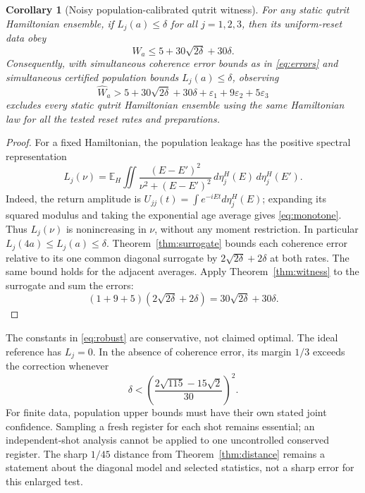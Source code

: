\documentclass[11pt,a4paper]{article}
\newtheorem{corollary}[theorem]{Corollary}
\newcommand{\E}{\mathbb E}
\begin{document}
\begin{corollary}[Noisy population-calibrated qutrit witness]\label{cor:robust}
For any static qutrit Hamiltonian ensemble, if
$L_j(a)\leq\delta$ for all $j=1,2,3$, then its uniform-reset data obey
\begin{equation}\label{eq:robust}
 W_a\leq5+30\sqrt{2\delta}+30\delta.
\end{equation}
Consequently, with simultaneous coherence error bounds as in
\eqref{eq:errors} and simultaneous certified population bounds
$L_j(a)\leq\delta$, observing
\[
 \widehat W_a>5+30\sqrt{2\delta}+30\delta
              +\varepsilon_1+9\varepsilon_2+5\varepsilon_3
\]
excludes every static qutrit Hamiltonian ensemble using the same
Hamiltonian law for all the tested reset rates and preparations.
\end{corollary}
\begin{proof}
For a fixed Hamiltonian, the population leakage has the positive
spectral representation
\begin{equation}\label{eq:monotone}
 L_j(\nu)=\E_H\iint
 \frac{(E-E')^2}{\nu^2+(E-E')^2}\,
 d\eta_j^H(E)\,d\eta_j^H(E').
\end{equation}
Indeed, the return amplitude is $U_{jj}(t)=\int e^{-iEt}d\eta_j^H(E)$;
expanding its squared modulus and taking the exponential age average
gives \eqref{eq:monotone}. Thus $L_j(\nu)$ is nonincreasing in
$\nu$, without any moment restriction. In particular
$L_j(4a)\leq L_j(a)\leq\delta$.
Theorem~\ref{thm:surrogate} bounds each coherence error relative to
its one common diagonal surrogate by $2\sqrt{2\delta}+2\delta$
at both rates. The same bound holds for the adjacent averages.
Apply Theorem~\ref{thm:witness} to the surrogate and sum the errors:
\[
 (1+9+5)(2\sqrt{2\delta}+2\delta)
 =30\sqrt{2\delta}+30\delta.
\]
\end{proof}

The constants in \eqref{eq:robust} are conservative, not claimed
optimal. The ideal reference has $L_j=0$. In the absence of coherence
error, its margin $1/3$ exceeds the correction whenever
\[
 \delta<\left(\frac{2\sqrt{115}-15\sqrt2}{30}\right)^2.
\]
For finite data, population upper bounds must have their own stated
joint confidence. Sampling a fresh register for each shot remains
essential; an independent-shot analysis cannot be applied to one
uncontrolled conserved register. The sharp $1/45$ distance from
Theorem~\ref{thm:distance} remains a statement about the diagonal
model and selected statistics, not a sharp error for this enlarged test.
\end{document}
